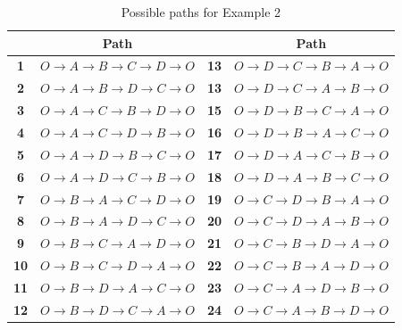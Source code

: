 \documentclass[a4paper]{article}
\begin{document}
\begin{table}[H]
    \centering
    \begin{tabular}{|c|c|c|c|}
    \hline
    ~     & Path&~&Path\\ 
    \hline
    \textbf{1}  & $O \to A \to B \to C \to D \to O$  &
    \textbf{13} & $O \to D \to C \to B \to A \to O$  \\
    \textbf{2}  & $O \to A \to B \to D \to C \to O$   &
    \textbf{13} & $O \to D \to C \to A \to B \to O$  \\

    \textbf{3}  & $O \to A \to C \to B \to D \to O$   &
    \textbf{15} & $O \to D \to B \to C \to A \to O$  \\

    \textbf{4}  & $O \to A \to C \to D \to B \to O$   &
    \textbf{16} & $O \to D \to B \to A \to C \to O$  \\

    \textbf{5}  & $O \to A \to D \to B \to C \to O$   &
    \textbf{17} & $O \to D \to A \to C \to B \to O$  \\

    \textbf{6}  & $O \to A \to D \to C \to B \to O$   &
    \textbf{18} & $O \to D \to A \to B \to C \to O$  \\

    \textbf{7}  & $O \to B \to A \to C \to D \to O$   &
    \textbf{19} & $O \to C \to D \to B \to A \to O$  \\

    \textbf{8}  & $O \to B \to A \to D \to C \to O$   &
    \textbf{20} & $O \to C \to D \to A \to B \to O$  \\

    \textbf{9}  & $O \to B \to C \to A \to D \to O$   &
    \textbf{21} & $O \to C \to B \to D \to A \to O$  \\

    \textbf{10} & $O \to B \to C \to D \to A \to O$   &
    \textbf{22} & $O \to C \to B \to A \to D \to O$  \\

    \textbf{11} & $O \to B \to D \to A \to C \to O$   &
    \textbf{23} & $O \to C \to A \to D \to B \to O$  \\

    \textbf{12} & $O \to B \to D \to C \to A \to O$  &
    \textbf{24} & $O \to C \to A \to B \to D \to O$  \\

    \hline
    \end{tabular}
    \caption{Possible paths for Example 2}
    \label{tab:PathsExample2}
\end{table}
\end{document}

